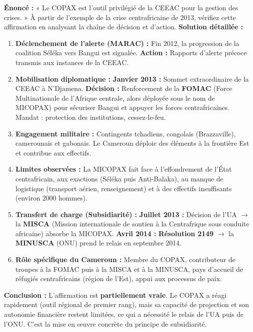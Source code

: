 \documentclass[11pt]{article}
\newcommand{\cle}[1]{{\popxbold\color{popdark}#1}}
\begin{document}
\begin{exoresolu}
    \textbf{Énoncé :} « Le COPAX est l'outil privilégié de la CEEAC pour la gestion des crises. » À partir de l'exemple de la crise centrafricaine de 2013, vérifiez cette affirmation en analysant la chaîne de décision et d'action.
    \tcblower
    \textbf{Solution détaillée :}
    \begin{enumerate}
        \item \textbf{Déclenchement de l'alerte (MARAC) :} Fin 2012, la progression de la coalition Séléka vers Bangui est signalée. \textbf{Action :} Rapports d'alerte précoce transmis aux instances de la CEEAC.
        \item \textbf{Mobilisation diplomatique :} \textbf{Janvier 2013 :} Sommet extraordinaire de la CEEAC à N'Djamena. \textbf{Décision :} Renforcement de la \textbf{FOMAC} (Force Multinationale de l'Afrique centrale, alors déployée sous le nom de MICOPAX) pour sécuriser Bangui et appuyer les forces centrafricaines. Mandat : protection des institutions, cessez-le-feu.
        \item \textbf{Engagement militaire :} Contingents tchadiens, congolais (Brazzaville), camerounais et gabonais. Le Cameroun déploie des éléments à la frontière Est et contribue aux effectifs.
        \item \textbf{Limites observées :} La MICOPAX fait face à l'effondrement de l'État centrafricain, aux exactions (Séléka puis Anti-Balaka), au manque de logistique (transport aérien, renseignement) et à des effectifs insuffisants (environ 2000 hommes).
        \item \textbf{Transfert de charge (Subsidiarité) :} \textbf{Juillet 2013 :} Décision de l'UA $\rightarrow$ la \textbf{MISCA} (Mission internationale de soutien à la Centrafrique sous conduite africaine) absorbe la MICOPAX. \textbf{Avril 2014 :} \textbf{Résolution 2149} $\rightarrow$ la \textbf{MINUSCA} (ONU) prend le relais en septembre 2014.
        \item \textbf{Rôle spécifique du Cameroun :} Membre du COPAX, contributeur de troupes à la FOMAC puis à la MISCA et à la MINUSCA, pays d'accueil de réfugiés centrafricains (région de l'Est), appui aux processus de paix.
    \end{enumerate}
    \textbf{Conclusion :} L'affirmation est \textbf{partiellement vraie}. Le COPAX a réagi rapidement (outil régional de premier rang), mais sa \cle{capacité de projection} et son \cle{autonomie financière} restent limitées, ce qui a nécessité le relais de l'UA puis de l'ONU. C'est la mise en œuvre concrète du principe de \cle{subsidiarité}.
\end{exoresolu}
\end{document}
